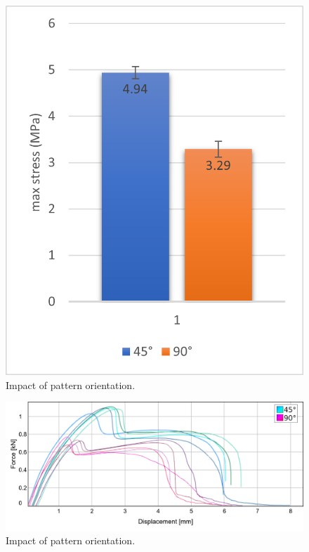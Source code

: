 \begin{figure}
	\centering
	\includegraphics[width=.5\columnwidth]{sources/testing/45vs90.png}
	\caption{Impact of pattern orientation.}
	\label{graph:45vs90}
\end{figure}


\begin{figure}
	\centering
	\includegraphics[width=\columnwidth]{sources/testing/45vs90_stress_strain.png}
	\caption{Impact of pattern orientation.}
	\label{graph:45vs90_stress_strain}
\end{figure}
